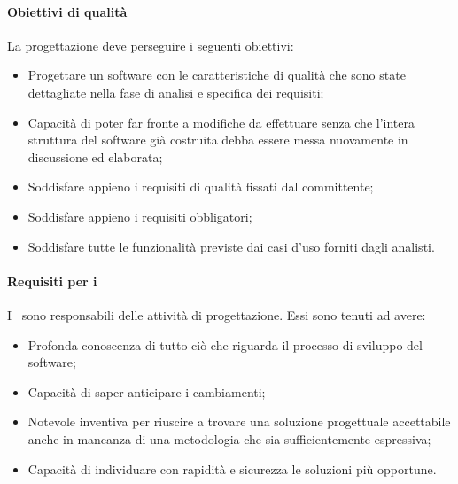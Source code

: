 \documentclass[../NormeDiProgetto_v3.0.0.tex]{subfiles}
\begin{document}
		\paragraph{Obiettivi di qualità}
			La progettazione deve perseguire i seguenti obiettivi:
			\begin{itemize}
				\item Progettare un software con le caratteristiche di qualità che sono state dettagliate nella fase di analisi e specifica dei requisiti;
				\item Capacità di poter far fronte a modifiche da effettuare senza che l'intera struttura del software già costruita debba essere messa nuovamente in discussione ed elaborata;
				\item Soddisfare appieno i requisiti di qualità fissati dal committente;
				\item Soddisfare appieno i requisiti obbligatori;
				\item Soddisfare tutte le funzionalità previste dai casi d'uso forniti dagli analisti.
			\end{itemize}

		\paragraph{Requisiti per i \progettisti}
			I \progettisti\ sono responsabili delle attività di progettazione. Essi sono tenuti ad avere:
			\begin{itemize}
				\item Profonda conoscenza di tutto ciò che riguarda il processo di sviluppo del software;
				\item Capacità di saper anticipare i cambiamenti;
				\item Notevole inventiva per riuscire a trovare una soluzione progettuale accettabile anche in mancanza di una metodologia che sia sufficientemente espressiva;
				\item Capacità di individuare con rapidità e sicurezza le soluzioni più opportune.
			\end{itemize}
\end{document}
